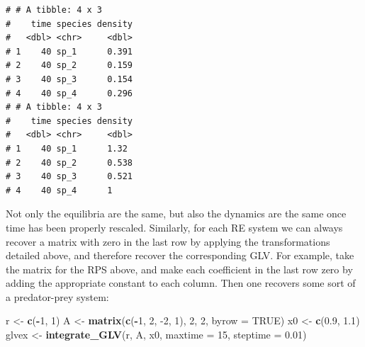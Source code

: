 \documentclass[]{book}
\newenvironment{Shaded}{\begin{snugshade}}{\end{snugshade}}
\newcommand{\DataTypeTok}[1]{\textcolor[rgb]{0.13,0.29,0.53}{#1}}
\newcommand{\DecValTok}[1]{\textcolor[rgb]{0.00,0.00,0.81}{#1}}
\newcommand{\FloatTok}[1]{\textcolor[rgb]{0.00,0.00,0.81}{#1}}
\newcommand{\KeywordTok}[1]{\textcolor[rgb]{0.13,0.29,0.53}{\textbf{#1}}}
\newcommand{\NormalTok}[1]{#1}
\newcommand{\OperatorTok}[1]{\textcolor[rgb]{0.81,0.36,0.00}{\textbf{#1}}}
\newcommand{\OtherTok}[1]{\textcolor[rgb]{0.56,0.35,0.01}{#1}}
\newcommand{\StringTok}[1]{\textcolor[rgb]{0.31,0.60,0.02}{#1}}
\begin{document}
\begin{Shaded}
\end{Shaded}

\begin{verbatim}
# # A tibble: 4 x 3
#    time species density
#   <dbl> <chr>     <dbl>
# 1    40 sp_1      0.391
# 2    40 sp_2      0.159
# 3    40 sp_3      0.154
# 4    40 sp_4      0.296
# # A tibble: 4 x 3
#    time species density
#   <dbl> <chr>     <dbl>
# 1    40 sp_1      1.32 
# 2    40 sp_2      0.538
# 3    40 sp_3      0.521
# 4    40 sp_4      1
\end{verbatim}

Not only the equilibria are the same, but also the dynamics are the same once time has been properly rescaled. Similarly, for each RE system we can always recover a matrix with zero in the last row by applying the transformations detailed above, and therefore recover the corresponding GLV. For example, take the matrix for the RPS above, and make each coefficient in the last row zero by adding the appropriate constant to each column. Then one recovers some sort of a predator-prey system:

\begin{Shaded}
\begin{Highlighting}[]
\NormalTok{r <-}\StringTok{ }\KeywordTok{c}\NormalTok{(}\OperatorTok{-}\DecValTok{1}\NormalTok{, }\DecValTok{1}\NormalTok{)}
\NormalTok{A <-}\StringTok{ }\KeywordTok{matrix}\NormalTok{(}\KeywordTok{c}\NormalTok{(}\OperatorTok{-}\DecValTok{1}\NormalTok{, }\DecValTok{2}\NormalTok{,}
              \DecValTok{-2}\NormalTok{, }\DecValTok{1}\NormalTok{), }\DecValTok{2}\NormalTok{, }\DecValTok{2}\NormalTok{, }\DataTypeTok{byrow =} \OtherTok{TRUE}\NormalTok{)}
\NormalTok{x0 <-}\StringTok{ }\KeywordTok{c}\NormalTok{(}\FloatTok{0.9}\NormalTok{, }\FloatTok{1.1}\NormalTok{)}
\NormalTok{glvex <-}\StringTok{ }\KeywordTok{integrate_GLV}\NormalTok{(r, A, x0, }\DataTypeTok{maxtime =} \DecValTok{15}\NormalTok{, }\DataTypeTok{steptime =} \FloatTok{0.01}\NormalTok{)}
\end{Highlighting}
\end{Shaded}
\end{document}
